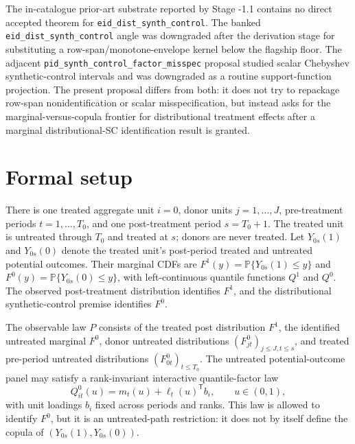 \documentclass[11pt]{article}
\renewcommand{\Pr}{\mathbb{P}}
\newcommand{\transpose}{\mathsf{T}}
\theoremstyle{definition}
\theoremstyle{plain}
\theoremstyle{remark}
\begin{document}
The in-catalogue prior-art substrate reported by Stage -1.1 contains no direct accepted theorem for \texttt{eid\_dist\_synth\_control}.  The banked \texttt{eid\_dist\_synth\_control} angle was downgraded after the derivation stage for substituting a row-span/monotone-envelope kernel below the flagship floor.  The adjacent \texttt{pid\_synth\_control\_factor\_misspec} proposal studied scalar Chebyshev synthetic-control intervals and was downgraded as a routine support-function projection.  The present proposal differs from both: it does not try to repackage row-span nonidentification or scalar misspecification, but instead asks for the marginal-versus-copula frontier for distributional treatment effects after a marginal distributional-SC identification result is granted.

\section{Formal setup}
There is one treated aggregate unit \(i=0\), donor units \(j=1,\ldots,J\), pre-treatment periods \(t=1,\ldots,T_0\), and one post-treatment period \(s=T_0+1\).  The treated unit is untreated through \(T_0\) and treated at \(s\); donors are never treated.  Let \(Y_{0s}(1)\) and \(Y_{0s}(0)\) denote the treated unit's post-period treated and untreated potential outcomes.  Their marginal CDFs are \(F^1(y)=\Pr\{Y_{0s}(1)\le y\}\) and \(F^0(y)=\Pr\{Y_{0s}(0)\le y\}\), with left-continuous quantile functions \(Q^1\) and \(Q^0\).  The observed post-treatment distribution identifies \(F^1\), and the distributional synthetic-control premise identifies \(F^0\).

The observable law \(P\) consists of the treated post distribution \(F^1\), the identified untreated marginal \(F^0\), donor untreated distributions \((F^0_{jt})_{j\le J,t\le s}\), and treated pre-period untreated distributions \((F^0_{0t})_{t\le T_0}\).  The untreated potential-outcome panel may satisfy a rank-invariant interactive quantile-factor law
\[
Q^0_{it}(u)=m_t(u)+\ell_t(u)^\transpose b_i,\qquad u\in(0,1),
\]
with unit loadings \(b_i\) fixed across periods and ranks.  This law is allowed to identify \(F^0\), but it is an untreated-path restriction: it does not by itself define the copula of \((Y_{0s}(1),Y_{0s}(0))\).
\end{document}
